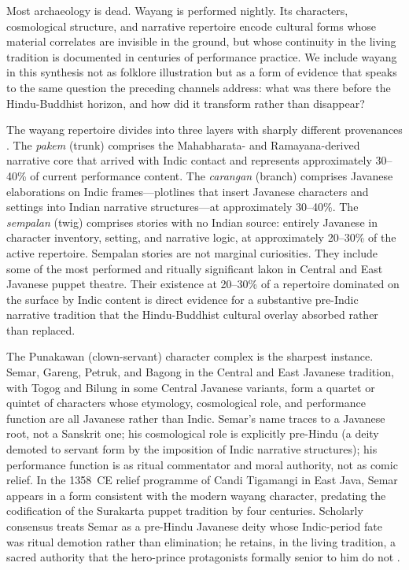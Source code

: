 \documentclass[12pt,a4paper]{article}
\begin{document}
Most archaeology is dead. Wayang is performed nightly. Its characters, cosmological structure, and narrative repertoire encode cultural forms whose material correlates are invisible in the ground, but whose continuity in the living tradition is documented in centuries of performance practice. We include wayang in this synthesis not as folklore illustration but as a form of evidence that speaks to the same question the preceding channels address: what was there before the Hindu-Buddhist horizon, and how did it transform rather than disappear?

The wayang repertoire divides into three layers with sharply different provenances \citep[E205]{amien_e205}. The \textit{pakem} (trunk) comprises the Mahabharata- and Ramayana-derived narrative core that arrived with Indic contact and represents approximately 30--40\% of current performance content. The \textit{carangan} (branch) comprises Javanese elaborations on Indic frames---plotlines that insert Javanese characters and settings into Indian narrative structures---at approximately 30--40\%. The \textit{sempalan} (twig) comprises stories with no Indian source: entirely Javanese in character inventory, setting, and narrative logic, at approximately 20--30\% of the active repertoire. Sempalan stories are not marginal curiosities. They include some of the most performed and ritually significant lakon in Central and East Javanese puppet theatre. Their existence at 20--30\% of a repertoire dominated on the surface by Indic content is direct evidence for a substantive pre-Indic narrative tradition that the Hindu-Buddhist cultural overlay absorbed rather than replaced.

The Punakawan (clown-servant) character complex is the sharpest instance. Semar, Gareng, Petruk, and Bagong in the Central and East Javanese tradition, with Togog and Bilung in some Central Javanese variants, form a quartet or quintet of characters whose etymology, cosmological role, and performance function are all Javanese rather than Indic. Semar's name traces to a Javanese root, not a Sanskrit one; his cosmological role is explicitly pre-Hindu (a deity demoted to servant form by the imposition of Indic narrative structures); his performance function is as ritual commentator and moral authority, not as comic relief. In the 1358~CE relief programme of Candi Tigamangi in East Java, Semar appears in a form consistent with the modern wayang character, predating the codification of the Surakarta puppet tradition by four centuries. Scholarly consensus treats Semar as a pre-Hindu Javanese deity whose Indic-period fate was ritual demotion rather than elimination; he retains, in the living tradition, a sacred authority that the hero-prince protagonists formally senior to him do not \citep[see the extensive treatment in][]{brandon1970}.
\end{document}

